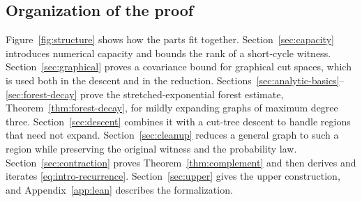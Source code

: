 \documentclass[11pt,a4paper]{article}
\numberwithin{equation}{section}
\theoremstyle{definition}
\theoremstyle{remark}
\begin{document}
\subsection{Organization of the proof}\label{sec:organization}
Figure~\ref{fig:structure} shows how the parts fit together. Section~\ref{sec:capacity} introduces numerical capacity and bounds the rank of a short-cycle witness. Section~\ref{sec:graphical} proves a covariance bound for graphical cut spaces, which is used both in the descent and in the reduction. Sections~\ref{sec:analytic-basics}--\ref{sec:forest-decay} prove the stretched-exponential forest estimate, Theorem~\ref{thm:forest-decay}, for mildly expanding graphs of maximum degree three. Section~\ref{sec:descent} combines it with a cut-tree descent to handle regions that need not expand. Section~\ref{sec:cleanup} reduces a general graph to such a region while preserving the original witness and the probability law. Section~\ref{sec:contraction} proves Theorem~\ref{thm:complement} and then derives and iterates \eqref{eq:intro-recurrence}. Section~\ref{sec:upper} gives the upper construction, and Appendix~\ref{app:lean} describes the formalization.
\end{document}
